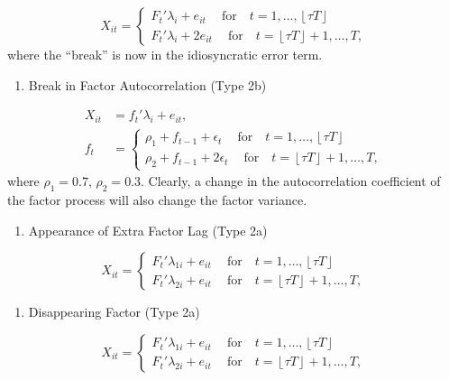 \documentclass[
]{article}
\providecommand{\tightlist}{%
  \setlength{\itemsep}{0pt}\setlength{\parskip}{0pt}}
\begin{document}
\[
X_{it} = \begin{cases}
F_{t}' \lambda_{i} + e_{it}\ \quad \text{for} \quad t = 1, \dots, \left \lfloor \tau T \right \rfloor  \\
F_{t}' \lambda_{i} + 2e_{it}\ \quad \text{for} \quad t = \left \lfloor \tau T \right \rfloor  + 1, \dots, T,
\end{cases}
\] where the ``break'' is now in the idiosyncratic error term.

\begin{enumerate}
\def\labelenumi{\arabic{enumi}.}
\setcounter{enumi}{6}
\tightlist
\item
  Break in Factor Autocorrelation (Type 2b)
\end{enumerate}

\[
\begin{aligned}
X_{it} &= 
f_t' \lambda_{i} + e_{it}, \\
f_t &= \begin{cases}
\rho_1 + f_{t - 1} + \epsilon_{t}\ \quad \text{for} \quad t = 1, \dots, \left \lfloor \tau T \right \rfloor  \\
\rho_2 + f_{t - 1} + 2\epsilon_{t}\ \quad \text{for} \quad t = \left \lfloor \tau T \right \rfloor  + 1, \dots, T,
\end{cases}
\end{aligned}
\] where \(\rho_1 = 0.7\), \(\rho_2 = 0.3\). Clearly, a change in the
autocorrelation coefficient of the factor process will also change the
factor variance.

\begin{enumerate}
\def\labelenumi{\arabic{enumi}.}
\setcounter{enumi}{7}
\tightlist
\item
  Appearance of Extra Factor Lag (Type 2a)
\end{enumerate}

\[
X_{it} = \begin{cases}
F_{t}' \lambda_{1i} + e_{it}\ \quad \text{for} \quad t = 1, \dots, \left \lfloor \tau T \right \rfloor  \\
F_{t}' \lambda_{2i} + e_{it}\ \quad \text{for} \quad t = \left \lfloor \tau T \right \rfloor  + 1, \dots, T,
\end{cases}
\]

\begin{enumerate}
\def\labelenumi{\arabic{enumi}.}
\setcounter{enumi}{8}
\tightlist
\item
  Disappearing Factor (Type 2a)
\end{enumerate}

\[
X_{it} = \begin{cases}
F_{t}' \lambda_{1i} + e_{it}\ \quad \text{for} \quad t = 1, \dots, \left \lfloor \tau T \right \rfloor  \\
F_{t}' \lambda_{2i} + e_{it}\ \quad \text{for} \quad t = \left \lfloor \tau T \right \rfloor  + 1, \dots, T,
\end{cases}
\]
\end{document}
